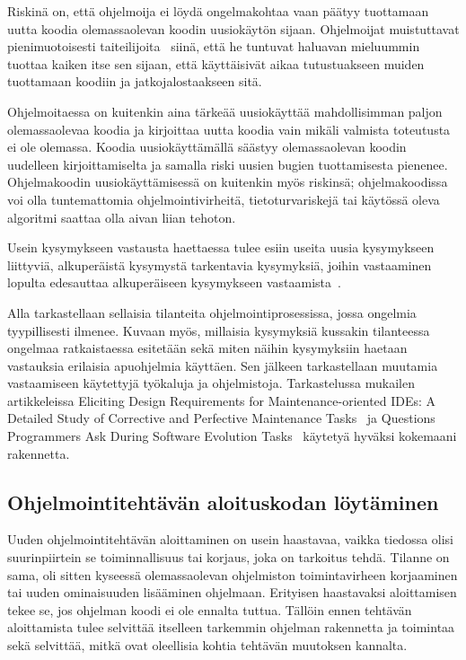 \documentclass[finnish]{tktltiki2}
\theoremstyle{definition}
\theoremstyle{remark}
\begin{document}
Riskinä on, että ohjelmoija ei löydä ongelmakohtaa vaan päätyy tuottamaan uutta koodia olemassaolevan koodin uusiokäytön sijaan. Ohjelmoijat muistuttavat pienimuotoisesti taiteilijoita~\cite{hackers-and-painters} siinä, että he tuntuvat haluavan mieluummin tuottaa kaiken itse sen sijaan, että käyttäisivät aikaa tutustuakseen muiden tuottamaan koodiin ja jatkojalostaakseen sitä.

Ohjelmoitaessa on kuitenkin aina tärkeää uusiokäyttää mahdollisimman paljon olemassaolevaa koodia ja kirjoittaa uutta koodia vain mikäli valmista toteutusta ei ole olemassa. Koodia uusiokäyttämällä säästyy olemassaolevan koodin uudelleen kirjoittamiselta ja samalla riski uusien bugien tuottamisesta pienenee. Ohjelmakoodin uusiokäyttämisessä on kuitenkin myös riskinsä; ohjelmakoodissa voi olla tuntemattomia ohjelmointivirheitä, tietoturvariskejä tai käytössä oleva algoritmi saattaa olla aivan liian tehoton.

Usein kysymykseen vastausta haettaessa tulee esiin useita uusia kysymykseen liittyviä, alkuperäistä kysymystä tarkentavia kysymyksiä, joihin vastaaminen lopulta edesauttaa alkuperäiseen kysymykseen vastaamista~\cite{questions-during-software-evolution-tasks}.

Alla tarkastellaan sellaisia tilanteita ohjelmointiprosessissa, jossa ongelmia tyypillisesti ilmenee. Kuvaan myös, millaisia kysymyksiä kussakin tilanteessa ongelmaa ratkaistaessa esitetään sekä miten näihin kysymyksiin haetaan vastauksia erilaisia apuohjelmia käyttäen. Sen jälkeen tarkastellaan muutamia vastaamiseen käytettyjä työkaluja ja ohjelmistoja. Tarkastelussa mukailen artikkeleissa Eliciting Design Requirements for Maintenance-oriented IDEs: A Detailed Study of Corrective and Perfective Maintenance Tasks~\cite{eliciting-design-requirements-for-maintenance-oriented-ides} ja Questions Programmers Ask During Software Evolution Tasks~\cite{questions-during-software-evolution-tasks} käytetyä hyväksi kokemaani rakennetta.

\subsection{Ohjelmointitehtävän aloituskodan löytäminen}

Uuden ohjelmointitehtävän aloittaminen on usein haastavaa, vaikka tiedossa olisi suurinpiirtein se toiminnallisuus tai korjaus, joka on tarkoitus tehdä. Tilanne on sama, oli sitten kyseessä olemassaolevan ohjelmiston toimintavirheen korjaaminen tai uuden ominaisuuden lisääminen ohjelmaan. Erityisen haastavaksi aloittamisen tekee se, jos ohjelman koodi ei ole ennalta tuttua. Tällöin ennen tehtävän aloittamista tulee selvittää itselleen tarkemmin ohjelman rakennetta ja toimintaa sekä selvittää, mitkä ovat oleellisia kohtia tehtävän muutoksen kannalta.
\end{document}
